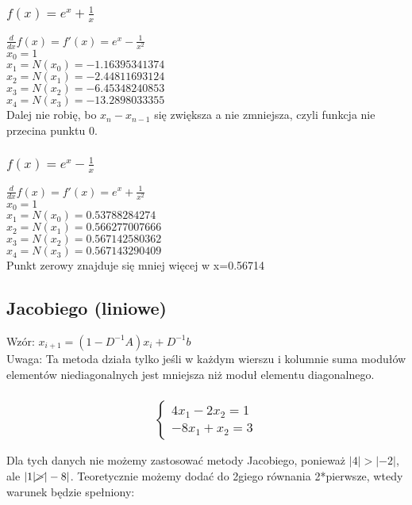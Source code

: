 \documentclass{article}
\begin{document}
\subsubsection{$f(x)=e^x+\frac{1}{x}$}
$\frac{d}{dx}f(x)=f'(x)=e^x-\frac{1}{x^2}$\\
$x_0=1$\\
$x_1=N(x_0)=-1.16395341374$\\
$x_2=N(x_1)=-2.44811693124$\\
$x_3=N(x_2)=-6.45348240853$\\
$x_4=N(x_3)=-13.2898033355$\\

Dalej nie robię, bo $x_n-x_{n-1}$ się zwiększa a nie zmniejsza, czyli funkcja nie przecina punktu 0.

\subsubsection{$f(x)=e^x-\frac{1}{x}$}
$\frac{d}{dx}f(x)=f'(x)=e^x+\frac{1}{x^2}$\\
$x_0=1$\\
$x_1=N(x_0)=0.53788284274$\\
$x_2=N(x_1)=0.566277007666$\\
$x_3=N(x_2)=0.567142580362$\\
$x_4=N(x_3)=0.567143290409$\\

Punkt zerowy znajduje się mniej więcej w x=0.56714

\subsection{Jacobiego (liniowe)}
Wzór: $x_{i+1}=(1-D^{-1}A)x_i+D^{-1}b$\\
Uwaga: Ta metoda działa tylko jeśli w każdym wierszu i kolumnie suma modułów elementów niediagonalnych jest mniejsza niż moduł elementu diagonalnego.
\subsubsection{\begin{equation*}\begin{cases}
    4x_1-2x_2=1\\
    -8x_1+x_2=3
\end{cases}\end{equation*}}
Dla tych danych nie możemy zastosować metody Jacobiego, ponieważ $|4|>|-2|$, ale $|1|\cancel{>}|-8|$. Teoretycznie możemy dodać do 2giego równania 2*pierwsze, wtedy warunek będzie spełniony:
\end{document}

